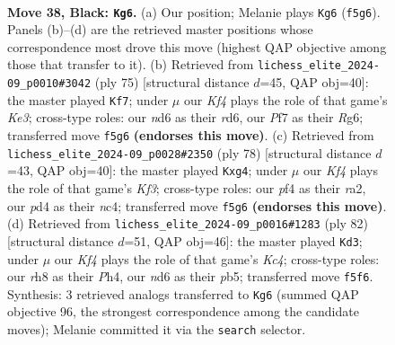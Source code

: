 \documentclass[11pt]{article}
\begin{document}
\clearpage

\begin{figure}[p]\centering
\begin{subfigure}{0.46\textwidth}\centering
\resizebox{\linewidth}{!}{%
\newchessgame
\chessboard[
  setfen={7R/5pp1/3Np3/1p3k1p/1r1P1P1P/4P1P1/8/6K1 b - - 2 38},
  showmover=false,
  pgfstyle=straightmove, color=movearrow, markmove={f5-g6}
]}
\caption{}
\end{subfigure}\hfill
\begin{subfigure}{0.46\textwidth}\centering
\resizebox{\linewidth}{!}{%
\newchessgame
\chessboard[
  setfen={8/8/2pRk1r1/2P2p1p/1P2pp1P/5P2/6P1/4K3 b - - 3 38},
  showmover=false,
  pgfstyle=straightmove, color=movearrow, markmove={e6-f7}
]}
\caption{}
\end{subfigure}
\\[4pt]
\begin{subfigure}{0.46\textwidth}\centering
\resizebox{\linewidth}{!}{%
\newchessgame
\chessboard[
  setfen={8/p4p2/1p2p1k1/3pP3/PRnP2p1/5K2/r4PP1/8 w - - 0 40},
  showmover=false,
  pgfstyle=straightmove, color=movearrow, markmove={f3-g4}
]}
\caption{}
\end{subfigure}\hfill
\begin{subfigure}{0.46\textwidth}\centering
\resizebox{\linewidth}{!}{%
\newchessgame
\chessboard[
  setfen={4n3/7R/p1k1P1p1/1pp2p2/2K2P1P/1P2P3/2P5/8 w - - 0 42},
  showmover=false,
  pgfstyle=straightmove, color=movearrow, markmove={c4-d3}
]}
\caption{}
\end{subfigure}
\caption{\textbf{Move 38, Black: \texttt{Kg6}.} (a) Our position; Melanie plays \texttt{Kg6} (\texttt{f5g6}). Panels (b)--(d) are the retrieved master positions whose correspondence most drove this move (highest QAP objective among those that transfer to it). (b) Retrieved from \texttt{lichess\_elite\_2024-09\_p0010\#3042} (ply 75) [structural distance $d$=45, QAP obj=40]: the master played \texttt{Kf7}; under $\mu$ our \emph{Kf4} plays the role of that game's \emph{Ke3}; cross-type roles: our \emph{n}d6 as their \emph{r}d6, our \emph{P}f7 as their \emph{R}g6; transferred move \texttt{f5g6} \textbf{(endorses this move)}. (c) Retrieved from \texttt{lichess\_elite\_2024-09\_p0028\#2350} (ply 78) [structural distance $d$=43, QAP obj=40]: the master played \texttt{Kxg4}; under $\mu$ our \emph{Kf4} plays the role of that game's \emph{Kf3}; cross-type roles: our \emph{p}f4 as their \emph{r}a2, our \emph{p}d4 as their \emph{n}c4; transferred move \texttt{f5g6} \textbf{(endorses this move)}. (d) Retrieved from \texttt{lichess\_elite\_2024-09\_p0016\#1283} (ply 82) [structural distance $d$=51, QAP obj=46]: the master played \texttt{Kd3}; under $\mu$ our \emph{Kf4} plays the role of that game's \emph{Kc4}; cross-type roles: our \emph{r}h8 as their \emph{P}h4, our \emph{n}d6 as their \emph{p}b5; transferred move \texttt{f5f6}. Synthesis: 3 retrieved analogs transferred to \texttt{Kg6} (summed QAP objective 96, the strongest correspondence among the candidate moves); Melanie committed it via the \texttt{search} selector.}
\label{fig:thought-m75}
\end{figure}
\end{document}
